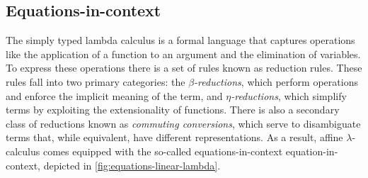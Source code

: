 \subsection{Equations-in-context}
The simply typed lambda calculus is a formal language that captures operations like the application of a function to an argument and the elimination of variables. To express these operations there is a set of rules known as reduction rules. These rules fall into two primary categories: the $\beta$\emph{-reductions}, which perform operations and enforce the implicit meaning of the term, and $\eta$\emph{-reductions}, which simplify terms by exploiting the extensionality of functions. 
There is also a secondary class of reductions known as \emph{commuting conversions}, which serve to disambiguate terms that, while equivalent, have different representations.
As a result, affine $\lambda$-calculus comes equipped with the so-called equations-in-context \gls{equation-in-context}, depicted in \autoref{fig:equations-linear-lambda}.
